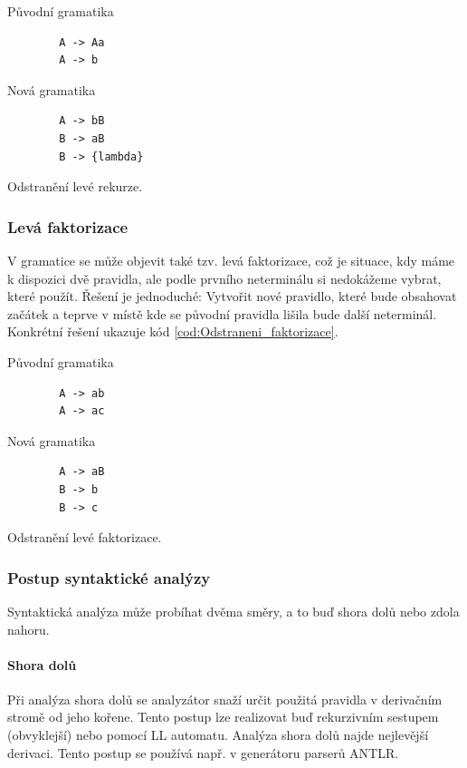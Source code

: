 \begin{kod}[h]
	Původní gramatika
	\begin{verbatim}
		A -> Aa
		A -> b
	\end{verbatim}
	
	Nová gramatika
	\begin{verbatim}
		A -> bB
		B -> aB
		B -> {lambda}
	\end{verbatim}
	\caption{Odstranění levé rekurze.}
	\label{cod:Odstraneni_rekurze}
\end{kod}


\subsubsection{Levá faktorizace}

V gramatice se může objevit také tzv. levá faktorizace, což je situace, kdy máme k dispozici dvě pravidla, ale podle prvního neterminálu si nedokážeme vybrat, které použít. Řešení je jednoduché: Vytvořit nové pravidlo, které bude obsahovat začátek a teprve v místě kde se původní pravidla lišila bude další neterminál. Konkrétní řešení ukazuje kód \ref{cod:Odstraneni_faktorizace}.

\begin{kod}[h]
	Původní gramatika
	\begin{verbatim}
		A -> ab
		A -> ac
	\end{verbatim}
	
	Nová gramatika
	\begin{verbatim}
		A -> aB
		B -> b
		B -> c
	\end{verbatim}
	\caption{Odstranění levé faktorizace.}
	\label{cod:Odstraneni_faktorizace}
\end{kod}


\subsubsection{Postup syntaktické analýzy}

Syntaktická analýza může probíhat dvěma směry, a to buď shora dolů nebo zdola nahoru.

\paragraph{Shora dolů} Při analýza shora dolů se analyzátor snaží určit použitá pravidla v derivačním stromě od jeho kořene. Tento postup lze realizovat buď rekurzivním sestupem (obvyklejší) nebo pomocí LL automatu. Analýza shora dolů najde nejlevější derivaci. Tento postup se používá např. v generátoru parserů ANTLR.

